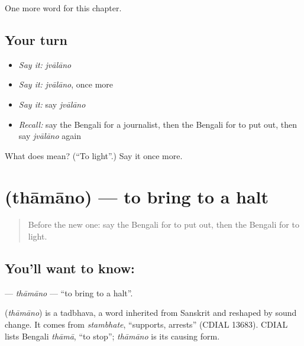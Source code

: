 \begin{grammarlens}[title={What you've built}]
One more word for this chapter.
\end{grammarlens}

\subsection*{Your turn}
\begin{itemize}
\raggedright
  \item \emph{Say it:} \emph{jvālāno}
  \item \emph{Say it:} \emph{jvālāno}, once more
  \item \emph{Say it:} say \emph{jvālāno}
  \item \emph{Recall:} say the Bengali for a journalist, then the Bengali for to put out, then say \emph{jvālāno} again
\end{itemize}

\begin{tcolorbox}[breakable,colback=teal!4,colframe=teal!35!black,title={Before you move on}]
What does  mean? (\textquotedblleft{}To light\textquotedblright{}.) Say it once more.
\end{tcolorbox}
\section[\texorpdfstring{\bn{থামানো} (thāmāno)}{থামানো (thāmāno)}]{ (thāmāno) — to bring to a halt}

\label{lesson:BN-C237-thamano}



\begin{quote}
Before the new one: say the Bengali for to put out, then the Bengali for to light.
\end{quote}

\subsection*{You'll want to know: }
\textbf{} — \emph{thāmāno} — \textquotedblleft{}to bring to a halt\textquotedblright{}.

\begin{cousinweb}
\textbf{} (\emph{thāmāno}) is a tadbhava, a word inherited from Sanskrit and reshaped by sound change. It comes from \emph{stambhate}, \textquotedblleft{}supports, arrests\textquotedblright{} (CDIAL 13683). CDIAL lists Bengali \emph{thāmā}, \textquotedblleft{}to stop\textquotedblright{}; \emph{thāmāno} is its causing form.
\end{cousinweb}

